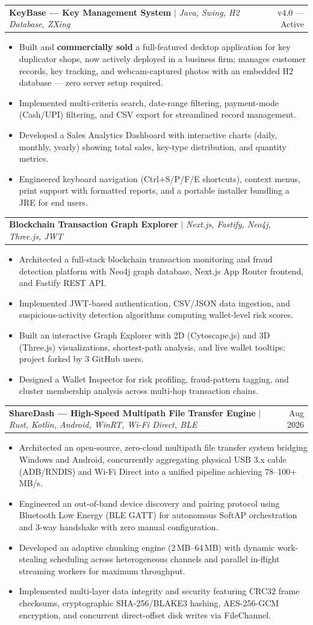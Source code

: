 \documentclass[a4paper,10pt]{article}
\makeatletter
\newcommand{\resumeItem}[1]{
  \item\small{
    {#1 \vspace{-2pt}}
  }
}
\newcommand{\resumeProjectHeading}[2]{
    \item
    \begin{tabular*}{0.97\textwidth}{l@{\extracolsep{\fill}}r}
      \small#1 & #2 \\
    \end{tabular*}\vspace{-7pt}
}
\newcommand{\resumeItemListStart}{\begin{itemize}}
\newcommand{\resumeItemListEnd}{\end{itemize}\vspace{-5pt}}
\makeatother
\begin{document}
      \resumeProjectHeading
          {\textbf{KeyBase --- Key Management System} $|$ \emph{Java, Swing, H2 Database, ZXing}}{v4.0 --- Active}
          \resumeItemListStart
            \resumeItem{Built and \textbf{commercially sold} a full-featured desktop application for key duplicator shops, now actively deployed in a business firm; manages customer records, key tracking, and webcam-captured photos with an embedded H2 database --- zero server setup required.}
            \resumeItem{Implemented multi-criteria search, date-range filtering, payment-mode (Cash/UPI) filtering, and CSV export for streamlined record management.}
            \resumeItem{Developed a Sales Analytics Dashboard with interactive charts (daily, monthly, yearly) showing total sales, key-type distribution, and quantity metrics.}
            \resumeItem{Engineered keyboard navigation (Ctrl+S/P/F/E shortcuts), context menus, print support with formatted reports, and a portable installer bundling a JRE for end users.}
          \resumeItemListEnd

      \resumeProjectHeading
          {\textbf{Blockchain Transaction Graph Explorer} $|$ \emph{Next.js, Fastify, Neo4j, Three.js, JWT}}{}
          \resumeItemListStart
            \resumeItem{Architected a full-stack blockchain transaction monitoring and fraud detection platform with Neo4j graph database, Next.js App Router frontend, and Fastify REST API.}
            \resumeItem{Implemented JWT-based authentication, CSV/JSON data ingestion, and suspicious-activity detection algorithms computing wallet-level risk scores.}
            \resumeItem{Built an interactive Graph Explorer with 2D (Cytoscape.js) and 3D (Three.js) visualizations, shortest-path analysis, and live wallet tooltips; project forked by 3 GitHub users.}
            \resumeItem{Designed a Wallet Inspector for risk profiling, fraud-pattern tagging, and cluster membership analysis across multi-hop transaction chains.}
          \resumeItemListEnd

      \resumeProjectHeading
          {\textbf{ShareDash --- High-Speed Multipath File Transfer Engine} $|$ \emph{Rust, Kotlin, Android, WinRT, Wi-Fi Direct, BLE}}{Aug 2026}
          \resumeItemListStart
            \resumeItem{Architected an open-source, zero-cloud multipath file transfer system bridging Windows and Android, concurrently aggregating physical USB 3.x cable (ADB/RNDIS) and Wi-Fi Direct into a unified pipeline achieving 78--100+ MB/s.}
            \resumeItem{Engineered an out-of-band device discovery and pairing protocol using Bluetooth Low Energy (BLE GATT) for autonomous SoftAP orchestration and 3-way handshake with zero manual configuration.}
            \resumeItem{Developed an adaptive chunking engine (2\,MB--64\,MB) with dynamic work-stealing scheduling across heterogeneous channels and parallel in-flight streaming workers for maximum throughput.}
            \resumeItem{Implemented multi-layer data integrity and security featuring CRC32 frame checksums, cryptographic SHA-256/BLAKE3 hashing, AES-256-GCM encryption, and concurrent direct-offset disk writes via FileChannel.}
          \resumeItemListEnd
\end{document}
